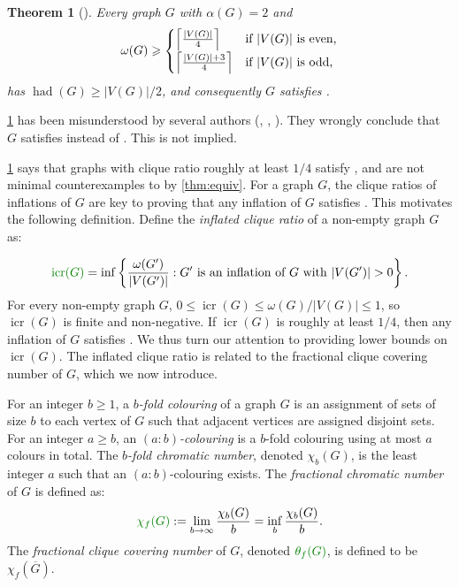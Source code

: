 \documentclass[11pt]{article}
\numberwithin{equation}{section}
\theoremstyle{plain}
\newtheorem{thm}[equation]{Theorem}
\theoremstyle{definition}
\renewcommand{\geq}{\geqslant}
\renewcommand{\leq}{\leqslant}
\DeclareMathOperator{\had}{had}
\DeclareMathOperator{\icr}{icr}
\newcommand{\defn}[1]{\textcolor{green!50!black}{\textit{#1}}}
\newcommand{\mathdefn}[1]{\textcolor{green!50!black}{#1}}
\begin{document}
\begin{samepage}
    \begin{thm}[\citet{CS12}]
        \label{thm:seagullsN/4}
        Every graph $G$ with $\alpha(G) = 2$ and
        \begin{equation*}
            \omega(G) \geq
            \begin{cases}
                \left\lceil\frac{|V(G)|}{4}\right\rceil   & \text{if $|V(G)|$ is even,} \\
                \noalign{\vskip1pt}
                \left\lceil\frac{|V(G)|+3}{4}\right\rceil & \text{if $|V(G)|$ is odd,}
            \end{cases}
        \end{equation*}
        has $\had(G) \geq |V(G)|/2$, and consequently $G$ satisfies .
    \end{thm}
\end{samepage}

\cref{thm:seagullsN/4} has been misunderstood by several authors (\citep[Theorem 1.6]{Bosse19}, \citep[Lemma 2]{Carter22}, \citep[Theorem 2.2]{Zhou23}). They wrongly conclude that $G$ satisfies  instead of . This is not implied.

\cref{thm:seagullsN/4} says that graphs with clique ratio roughly at least $1/4$ satisfy , and are not minimal counterexamples to  by \cref{thm:equiv}. For a graph $G$, the clique ratios of inflations of $G$ are key to proving that any inflation of $G$ satisfies . This motivates the following definition. Define the \defn{inflated clique ratio} of a non-empty graph $G$ as:

\begin{equation*}
    \mathdefn{\icr(G)} = \inf \left \{\frac{\omega(G')}{|V(G')|} : \text{$G'$ is an inflation of $G$ with $|V(G')| > 0$}\right \}.
\end{equation*}
For every non-empty graph $G$, $0 \leq \icr(G) \leq \omega(G) / |V(G)| \leq 1$, so $\icr(G)$ is finite and non-negative. If $\icr(G)$ is roughly at least $1/4$, then any inflation of $G$ satisfies . We thus turn our attention to providing lower bounds on $\icr(G)$.
The inflated clique ratio is related to the fractional clique covering number of $G$, which we now introduce.

For an integer $b \geq 1$, a \defn{$b$-fold colouring} of a graph $G$ is an assignment of sets of size $b$ to each vertex of $G$ such that adjacent vertices are assigned disjoint sets. For an integer $a \geq b$, an \defn{$(a:b)$-colouring} is a $b$-fold colouring using at most $a$ colours in total. The \defn{$b$-fold chromatic number}, denoted \defn{$\chi_b(G)$}, is the least integer $a$ such that an $(a:b)$-colouring exists. The \defn{fractional chromatic number} of $G$ is defined as:
\begin{equation*}
    \mathdefn{\chi_f(G)}:= \lim_{b \to \infty} \frac{\chi_b(G)}{b} = \inf_b \frac{\chi_b(G)}{b}.
\end{equation*}
The \defn{fractional clique covering number} of $G$, denoted $\mathdefn{\theta_f(G)}$, is defined to be $\chi_f(\overline{G})$.
\end{document}
